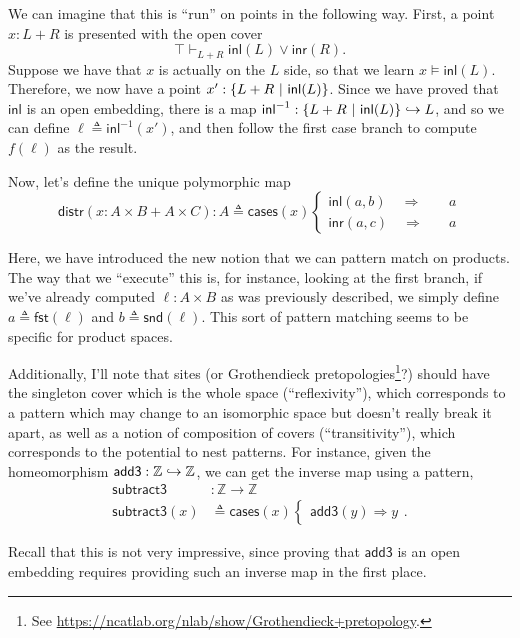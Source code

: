 We can imagine that this is ``run'' on points in the following way. First, a point $x : L + R$ is presented with the open cover
\[
\top \vdash_{L + R} \mathsf{inl}(L) \vee \mathsf{inr}(R).
\]
Suppose we have that $x$ is actually on the $L$ side, so that we learn $x \models \mathsf{inl}(L)$. Therefore, we now have a point $x' : \{ L + R \ |\  \mathsf{inl}(L) \}$. Since we have proved that $\mathsf{inl}$ is an open embedding, there is a map $\mathsf{inl}^{-1} : \{ L + R \ |\  \mathsf{inl}(L) \} \hookrightarrow L$, and so we can define $\ell \triangleq \mathsf{inl}^{-1}(x')$, and then follow the first case branch to compute $f(\ell)$ as the result.

Now, let's define the unique polymorphic map
\[
\mathsf{distr}(x : A \times B + A \times C) : A \triangleq
\mathsf{cases}(x)
  \begin{cases}
  \mathsf{inl}(a, b) \quad \Longrightarrow \quad &a
  \\ \mathsf{inr}(a, c) \quad \Longrightarrow \quad &a
  \end{cases}
\]

Here, we have introduced the new notion that we can pattern match on products. The way that we ``execute'' this is, for instance, looking at the first branch, if we've already computed $\ell : A \times B$ as was previously described, we simply define $a \triangleq \mathsf{fst}(\ell)$ and $b \triangleq \mathsf{snd}(\ell)$. This sort of pattern matching seems to be specific for product spaces.

Additionally, I'll note that sites (or Grothendieck pretopologies\footnote{See \url{https://ncatlab.org/nlab/show/Grothendieck+pretopology}.}?) should have the singleton cover which is the whole space (``reflexivity''), which corresponds to a pattern which may change to an isomorphic space but doesn't really break it apart, as well as a notion of composition of covers (``transitivity''), which corresponds to the potential to nest patterns. For instance, given the homeomorphism $\mathsf{add3} : \mathbb{Z} \hookrightarrow \mathbb{Z}$, we can get the inverse map using a pattern,
\begin{align*}
\mathsf{subtract3} &: \mathbb{Z} \to \mathbb{Z}
\\
\mathsf{subtract3}(x) &\triangleq
\mathsf{cases}(x)
\begin{cases}
\mathsf{add3}(y) \Longrightarrow y
\end{cases}.
\end{align*}

Recall that this is not very impressive, since proving that $\mathsf{add3}$ is an open embedding requires providing such an inverse map in the first place.

